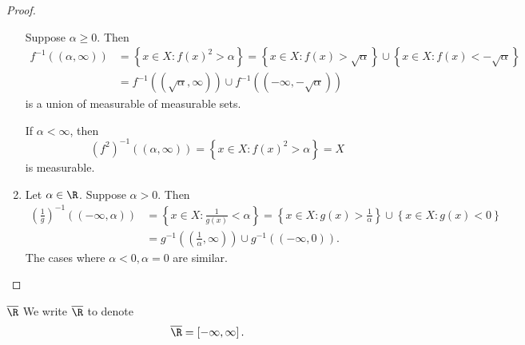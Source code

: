 \documentclass[pmath451]{subfiles}
\begin{document}
\begin{proof}
\begin{enumerate}
                Suppose $\alpha\geq 0$. Then
                \begin{equation*}
                    \begin{aligned}
                        f^{-1}\left( \left( \alpha,\infty \right) \right) & = \left\lbrace x\in X: f\left( x \right)^{2} > \alpha \right\rbrace = \left\lbrace x\in X: f\left( x \right) > \sqrt{\alpha} \right\rbrace \cup \left\lbrace x\in X: f\left( x \right) < -\sqrt{\alpha} \right\rbrace \\
                                                                          & = f^{-1}\left( \left( \sqrt{\alpha},\infty \right) \right) \cup f^{-1}\left( \left( -\infty,-\sqrt{\alpha} \right) \right)
                    \end{aligned} 
                \end{equation*}
                is a union of measurable of measurable sets.

                If $\alpha<\infty$, then
                \begin{equation*}
                    \left( f^{2} \right)^{-1}\left( \left( \alpha,\infty \right) \right) = \left\lbrace x\in X: f\left( x \right)^{2}>\alpha \right\rbrace = X
                \end{equation*}
                is measurable.

            \item Let $\alpha\in\R$. Suppose $\alpha>0$. Then
                \begin{equation*}
                    \begin{aligned}
                        \left( \frac{1}{g} \right)^{-1}\left( \left( -\infty,\alpha \right) \right) & = \left\lbrace x\in X: \frac{1}{g\left( x \right)}<\alpha \right\rbrace = \left\lbrace x\in X: g\left( x \right)>\frac{1}{\alpha} \right\rbrace \cup \left\lbrace x\in X: g\left( x \right) < 0 \right\rbrace \\
                                                                                                    & = g^{-1}\left( \left( \frac{1}{\alpha},\infty \right) \right) \cup g^{-1}\left( \left( -\infty,0 \right) \right).
                    \end{aligned} 
                \end{equation*}
                The cases where $\alpha<0,\alpha=0$ are similar.
        \end{enumerate}
    \end{proof}
    
    \begin{notation}{$\overline{\R}$}
        We write $\overline{\R}$ to denote
        \begin{equation*}
            \overline{\R} = \left[ -\infty,\infty \right].
        \end{equation*}
    \end{notation}
\end{document}
